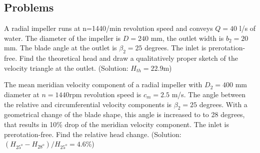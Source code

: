 \subsection{Problems}


A radial impeller runs at n=1440/min revolution speed and conveys $Q=40$ l/s of water. The diameter of the impeller is $D= 240$ mm, the outlet width is $b_2=20$ mm. The blade angle at the outlet is $\beta_2 = 25$ degrees. The inlet is prerotation-free. Find the theoretical head and draw a qualitatively proper sketch of the velocity triangle at the outlet. (Solution: $H_{th}=22.9$m)

\vspace{1cm}

The mean meridian velocity component of a radial impeller with $D_2=400$ mm diameter at $n=1440$rpm revolution speed is $c_m= 2.5$ m/s. The angle between the relative and circumferential velocity components is $\beta_2=25$ degrees. With a geometrical change of the blade shape, this angle is increased to to 28 degrees, that results in 10\% drop of the meridian velocity component. The inlet is prerotation-free. Find the relative head change. (Solution: $(H_{25^o}-H_{28^o})/H_{25^o}=4.6$\%) 

